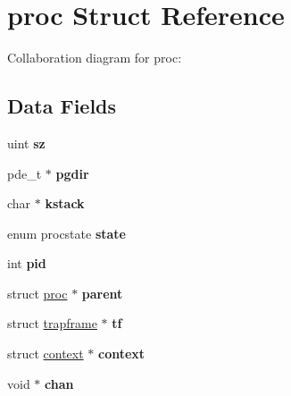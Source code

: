 \hypertarget{structproc}{}\section{proc Struct Reference}
\label{structproc}


Collaboration diagram for proc\+:
\subsection*{Data Fields}
\begin{DoxyCompactItemize}
\item 
uint {\bfseries sz}\hypertarget{structproc_a6e67042bb361124ff287af88efc33e00}{}\label{structproc_a6e67042bb361124ff287af88efc33e00}

\item 
pde\+\_\+t $\ast$ {\bfseries pgdir}\hypertarget{structproc_ad430afc653e9eb6cee33954d5545b79d}{}\label{structproc_ad430afc653e9eb6cee33954d5545b79d}

\item 
char $\ast$ {\bfseries kstack}\hypertarget{structproc_a9f556df98482bff6c9216013d7581ae4}{}\label{structproc_a9f556df98482bff6c9216013d7581ae4}

\item 
enum procstate {\bfseries state}\hypertarget{structproc_a0f2fe91548a1382672ae26e29ca9e736}{}\label{structproc_a0f2fe91548a1382672ae26e29ca9e736}

\item 
int {\bfseries pid}\hypertarget{structproc_acf2bdf54d1f957ccbcdc987007029944}{}\label{structproc_acf2bdf54d1f957ccbcdc987007029944}

\item 
struct \hyperlink{structproc}{proc} $\ast$ {\bfseries parent}\hypertarget{structproc_a14ea8849701ffafba4d142725de154d4}{}\label{structproc_a14ea8849701ffafba4d142725de154d4}

\item 
struct \hyperlink{structtrapframe}{trapframe} $\ast$ {\bfseries tf}\hypertarget{structproc_a56ec07ac1e10ce42adfc8dd2a366071f}{}\label{structproc_a56ec07ac1e10ce42adfc8dd2a366071f}

\item 
struct \hyperlink{structcontext}{context} $\ast$ {\bfseries context}\hypertarget{structproc_ae0d9bffe1ad1c7d60dd2733be0a2333c}{}\label{structproc_ae0d9bffe1ad1c7d60dd2733be0a2333c}

\item 
void $\ast$ {\bfseries chan}\hypertarget{structproc_a03048a49756c2243576208ba4ec5fbd4}{}\label{structproc_a03048a49756c2243576208ba4ec5fbd4}


\end{DoxyCompactItemize}
